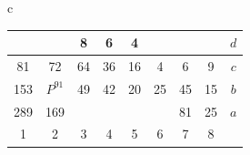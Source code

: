 \documentclass[12pt]{article}
\begin{document}
{{\begin{tabular}{c}
\begin{tabular}{|c|c|c|c|c|c|c|c||c}
\quad & \quad & \circlet{\,}8 & \circlet{\,}6 & \circlet{\,}4 & \quad & \quad & \quad & $d$ \\ \hline
\trianglepa{\,}81 & \trianglepa{\,}72 & \circlet{\,}64 & \circlet{\,}36 & \circlet{\,}16 & \circlet{\,}4 & \trianglepa{\,}6 & \trianglepa{\,}9 & $c$ \\ \hline
\squad{\,}153 & \rhombus{\,}$P^{91}$ & \trianglepa{\,}49 & \trianglepa{\,}42 & \trianglepa{\,}20 & \trianglepa{\,}25 & \squad{\,}45 & \squad{\,}15 & $b$ \\ \hline
\squad{\,}289 & \squad{\,}169 & \quad & \quad & \quad & \quad & \squad{\,}81 & \squad{\,}25 & $a$ \\ \hline
1 & 2 & 3 & 4 & 5 & 6 & 7 & 8 & \\
\end{tabular}
\end{tabular}
}}



\end{document}
